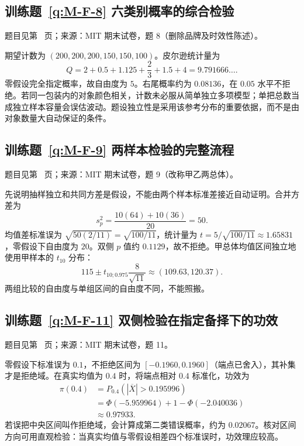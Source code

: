 \subsection*{训练题~\ref{q:M-F-8} 六类别概率的综合检验}\label{a:M-F-8}{\small 题目见第~\pageref{q:M-F-8} 页；来源：MIT 期末试卷，题 8（删除品牌及时效性陈述）。}
\begin{solve}期望计数为 $(200,200,200,150,150,100)$。皮尔逊统计量为\[Q=2+0.5+1.125+\frac23+1.5+4=9.791666\ldots.\]零假设完全指定概率，故自由度为 $5$。右尾概率约为 $0.08136$，在 $0.05$ 水平不拒绝。若同一包装内的对象颜色相关，计数未必服从简单独立多项模型；单把总数当成独立样本容量会误估波动。题设独立性是采用该参考分布的重要依据，而不是由对象数量大自动保证的条件。\end{solve}

\subsection*{训练题~\ref{q:M-F-9} 两样本检验的完整流程}\label{a:M-F-9}{\small 题目见第~\pageref{q:M-F-9} 页；来源：MIT 期末试卷，题 9（改称甲乙两总体）。}
\begin{solve}先说明抽样独立和共同方差是假设，不能由两个样本标准差接近自动证明。合并方差为\[s_p^2=\frac{10(64)+10(36)}{20}=50.\]均值差标准误为 $\sqrt{50(2/11)}=\sqrt{100/11}$，统计量为 $t=5/\sqrt{100/11}\approx1.65831$，零假设下自由度为 $20$。双侧 $p$ 值约 $0.1129$，故不拒绝。甲总体均值区间独立地使用甲样本的 $t_{10}$ 分布：\[115\pm t_{10;0.975}\frac8{\sqrt{11}}\approx(109.63,120.37).\]两组比较的自由度与单组区间的自由度不同，不能照搬。\end{solve}

\subsection*{训练题~\ref{q:M-F-11} 双侧检验在指定备择下的功效}\label{a:M-F-11}{\small 题目见第~\pageref{q:M-F-11} 页；来源：MIT 期末试卷，题 11。}
\begin{solve}零假设下标准误为 $0.1$，不拒绝区间为 $[-0.1960,0.1960]$（端点已舍入），其补集才是拒绝域。在真实均值为 $0.4$ 时，将端点相对 $0.4$ 标准化，功效为\[\begin{aligned}\pi(0.4)&=P_{0.4}(|\overline X|>0.195996)\\&=\Phi(-5.959964)+1-\Phi(-2.040036)\\&\approx0.97933.\end{aligned}\]若误把中央区间叫作拒绝域，会计算成第二类错误概率，约为 $0.02067$。核对区间方向可用直观检验：当真实均值与零假设相差四个标准误时，功效理应较高。\end{solve}

